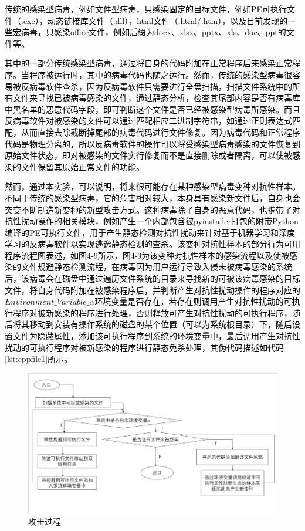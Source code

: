 \textcolor{black}{传统的感染型病毒，例如文件型病毒，只感染固定的目标文件\parencite{ref37}，例如PE可执行文件（.exe），动态链接库文件（.dll），html文件（.html/.htm），以及目前发现的一些宏病毒，只感染office文件，例如后缀为docx、xlsx、pptx、xls、doc、ppt的文件等。}

\textcolor{black}{其中的一部分传统感染型病毒，通过将自身的代码附加在正常程序后来感染正常程序。当程序被运行时，其中的病毒代码也随之运行。然而，传统的感染型病毒很容易被反病毒软件查杀，因为反病毒软件只需要进行全盘扫描，扫描文件系统中的所有文件来寻找已被病毒感染的文件，通过静态分析，检查其尾部内容是否有病毒库中黑名单的恶意代码字段，即可判断这个文件是否已经被感染型病毒所感染。而且反病毒软件对被感染的文件可以通过匹配相应二进制字符串，如通过正则表达式匹配，从而直接去除截断掉尾部的病毒代码进行文件修复。因为病毒代码和正常程序代码是物理分离的，所以反病毒软件的操作可以将受感染型病毒感染的文件恢复到原始文件状态，即对被感染的文件实行修复而不是直接删除或者隔离，可以使被感染的文件保留其原始正常文件的功能。}

\textcolor{black}{然而，通过本实验，可以说明，将来很可能存在某种感染型病毒变种对抗性样本。不同于传统的感染型病毒，它的危害相对较大，本身具有感染新文件后，自身也会突变不断制造新变种的新型攻击方式。这种病毒除了自身的恶意代码，也携带了对抗性扰动操作的相关模块，例如产生一个内部包含被pyinstaller打包的附带Python编译的PE可执行文件，用于产生静态检测对抗性扰动来针对基于机器学习和深度学习的反病毒软件以实现逃逸静态检测的查杀。该变种对抗性样本的部分行为可用程序流程图表述，如图4-9所示，图4-9为该变种对抗性样本的感染流程以及使被感染的文件规避静态检测流程，在病毒因为用户运行导致入侵未被病毒感染的系统后，该病毒会在磁盘中通过遍历文件系统的目录来寻找新的可被该病毒感染的目标文件，将自身代码附加在被感染程序后，并判断产生对抗性扰动操作的程序对应的$Environment\_Variable\_\alpha$环境变量是否存在，若存在则调用产生对抗性扰动的可执行程序对被新感染的程序进行处理，否则释放可产生对抗性扰动的可执行程序，随后将其移动到安装有操作系统的磁盘的某个位置（可以为系统根目录）下，随后设置文件为隐藏属性，添加该可执行程序到系统的环境变量中，最后调用产生对抗性扰动的可执行程序对被新感染的程序进行静态免杀处理，其伪代码描述如代码\ref{lst:cppfile1}所示。}

\begin{figure}
  \centering
  \includegraphics[]{images/attack.png}
  \caption{攻击过程}\label{fig:attack}
\end{figure}

